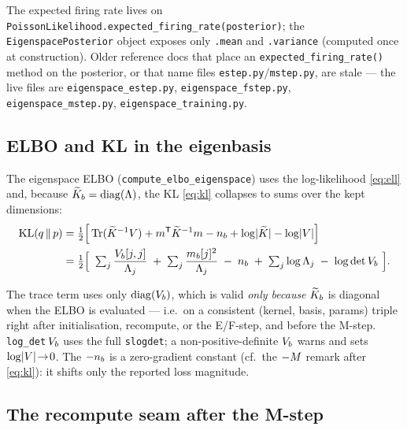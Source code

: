 \begin{remark}
The expected firing rate lives on
\texttt{PoissonLikelihood.\allowbreak expected\_firing\_rate(posterior)}; the
\texttt{Eigenspace\-Posterior} object exposes only \texttt{.mean} and
\texttt{.variance} (computed once at construction). Older reference docs that
place an \texttt{expected\_firing\_rate()} method on the posterior, or that name
files \texttt{estep.py}/\texttt{mstep.py}, are stale --- the live files are
\texttt{eigenspace\_estep.py}, \texttt{eigenspace\_fstep.py},
\texttt{eigenspace\_mstep.py}, \texttt{eigenspace\_training.py}.
\end{remark}

\subsection{ELBO and KL in the eigenbasis}\label{sec:eig-kl}

The eigenspace ELBO (\texttt{compute\_elbo\_eigenspace}) uses the log-likelihood
\eqref{eq:ell} and, because $\widetilde{K}_{b}=\operatorname{diag}(\Lambda)$, the KL \eqref{eq:kl} collapses
to sums over the kept dimensions:
\begin{align}
  \mathrm{KL}(q\,\|\,p)
    &= \tfrac12\Big[\operatorname{Tr}(\widetilde{K}^{-1}V)+m^{\mathsf{T}}\widetilde{K}^{-1}m-n_{b}
        +\log\lvert\widetilde{K}\rvert-\log\lvert V\rvert\Big] \notag\\
    &= \tfrac12\Big[\ \textstyle\sum_j \dfrac{V_{b}[j,j]}{\Lambda_j}
        \;+\; \sum_j \dfrac{m_{b}[j]^2}{\Lambda_j}
        \;-\; n_{b}
        \;+\; \sum_j \log\Lambda_j
        \;-\; \log\det V_{b}\ \Big].
  \label{eq:eigkl}
\end{align}

\begin{remark}
The trace term uses only $\operatorname{diag}(V_{b})$, which is valid \emph{only because}
$\widetilde{K}_{b}$ is diagonal when the ELBO is evaluated --- i.e.\ on a consistent
(kernel, basis, params) triple right after initialisation, recompute, or the
E/F-step, and before the M-step. \texttt{log\_det}$\,V_{b}$ uses the full
\texttt{slogdet}; a non-positive-definite $V_{b}$ warns and sets $\log\lvert V\rvert\!\to\!0$.
The $-n_{b}$ is a zero-gradient constant (cf.\ the $-M$ remark after
\eqref{eq:kl}): it shifts only the reported loss magnitude.
\end{remark}

\subsection{The recompute seam after the M-step}\label{sec:recompute}


